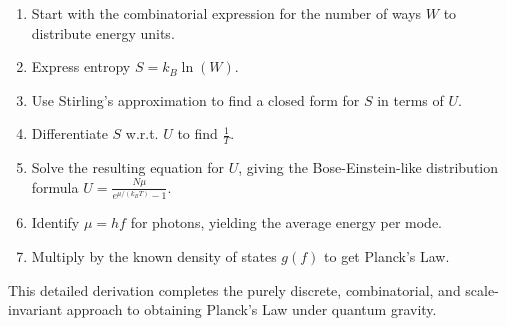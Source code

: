 \documentclass{article}
\begin{document}
\begin{enumerate}
    \item Start with the combinatorial expression for the number of ways $W$ to distribute energy units.
    \item Express entropy $S = k_B\ln(W)$.
    \item Use Stirling’s approximation to find a closed form for $S$ in terms of $U$.
    \item Differentiate $S$ w.r.t. $U$ to find $\frac{1}{T}$.
    \item Solve the resulting equation for $U$, giving the Bose-Einstein-like distribution formula $U = \frac{N\mu}{e^{\mu/(k_B T)}-1}$.
    \item Identify $\mu = hf$ for photons, yielding the average energy per mode.
    \item Multiply by the known density of states $g(f)$ to get Planck’s Law.
\end{enumerate}

This detailed derivation completes the purely discrete, combinatorial, and scale-invariant approach to obtaining Planck’s Law under quantum gravity.




\end{document}
